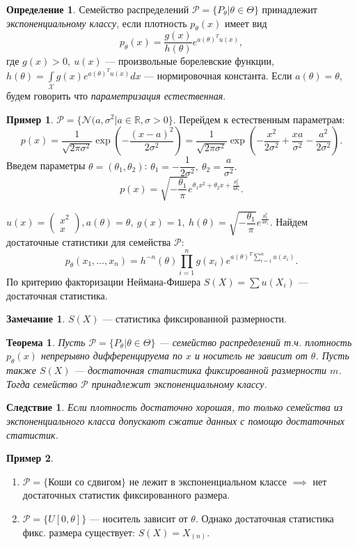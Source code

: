 \documentclass[12pt]{report}
\newtheorem{theorem}{Теорема}
\newtheorem{corollary}{Следствие}
\theoremstyle{definition}
\newtheorem{definition}{Определение}
\newtheorem{example}{Пример}
\newtheorem{remark}{Замечание}
\begin{document}
\begin{definition}
	Семейство распределений $\mathcal{P} = \{P_\theta \vert \theta \in \Theta \}$ принадлежит \emph{экспоненциальному классу}, если плотность $p_\theta(x)$ имеет вид
	$$p_\theta(x) = \dfrac{g(x)}{h(\theta)}e^{a(\theta)^Tu(x)}, $$
	где $g(x) > 0,\ u(x)$ — произвольные борелевские функции,  
	$h(\theta) = \int\limits_\mathscr{X}g(x)e^{a(\theta)^Tu(x)}dx$ — нормировочная константа.  
	Если $a(\theta) = \theta$, будем говорить что \emph{параметризация естественная}.
\end{definition}

\begin{example}
	$\mathcal{P} = \{\mathcal{N}(a, \sigma^2 \vert a \in \mathbb{R}, \sigma > 0\}$. Перейдем к естественным параметрам:
$$p(x) = \dfrac{1}{\sqrt{2\pi\sigma^2}}\exp\left(-\dfrac{(x-a)^2}{2\sigma^2}\right) = \dfrac{1}{\sqrt{2\pi\sigma^2}}\exp\left(-\dfrac{x^2}{2\sigma^2} + \dfrac{xa}{\sigma^2} - \dfrac{a^2}{2\sigma^2}\right).$$
Введем параметры $\theta = (\theta_1, \theta_2)$: $\theta_1 = -\dfrac{1}{2\sigma^2},\ \theta_2 = \dfrac{a}{\sigma^2}.$
$$ p(x) = \sqrt{-\dfrac{\theta_1}{\pi}}e^{\theta_1x^2 + \theta_2x + \frac{\theta_2^2}{4\theta_1}}. $$ 

$u(x) = \begin{pmatrix}
x^2 \\
x
\end{pmatrix}, a(\theta) = \theta,\ g(x) = 1,\ h(\theta)= \sqrt{-\dfrac{\theta_1}{\pi}}e^{\frac{\theta_2^2}{4\theta_1}}$.  
Найдем достаточные статистики для семейства $\mathcal{P}$:
$$p_\theta(x_1, \dots, x_n) = h^{-n}(\theta)\prod_{i=1}^{n}g(x_i)e^{a({\theta})^T\sum\limits_{i=1}^nu(x_i)}.$$  
По критерию факторизации Неймана-Фишера $S(X) = \sum u(X_i)$ — достаточная статистика.
\end{example}

\begin{remark}
	$S(X)$ — статистика фиксированной размерности.
\end{remark}
\begin{theorem}
	Пусть $\mathcal{P} = \{P_\theta \vert \theta \in \Theta \}$ — семейство распределений т.ч. плотность $p_\theta(x)$ непрерывно дифференцируема по $x$ и носитель не зависит от $\theta$. Пусть также $S(X)$ — достаточная статистика фиксированной размерности $m$. Тогда семейство $\mathcal{P}$ принадлежит экспоненциальному классу.  
\end{theorem}
\begin{corollary}
	Если плотность достаточно хорошая, то только семейства из экспоненциального класса допускают сжатие данных с помощю достаточных статистик.
\end{corollary}
\begin{example}
	$\;$
	\begin{enumerate}
		\item  $\mathcal{P} = \{\text{Коши со сдвигом}\}$ не лежит в экспоненциальном классе $\implies$ нет достаточных статистик фиксированного размера.
 		\item $\mathcal{P} = \{U[0, \theta]\}$ — носитель зависит от $\theta$. Однако достаточная статистика фикс. размера существует: $S(X) = X_{(n)}$.
	\end{enumerate}
\end{example}
\end{document}
